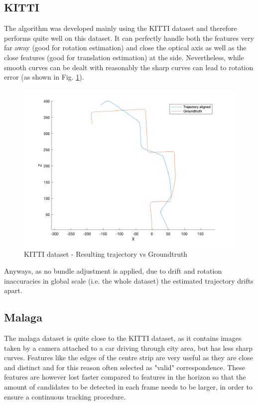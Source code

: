 \documentclass[letterpaper, 12 pt]{article}
\begin{document}
\begin{multicols*}{2}
\subsection{KITTI}
The algorithm was developed mainly using the KITTI dataset and therefore performs quite well on this dataset. It can perfectly handle both the features very far away (good for rotation estimation) and close the optical axis as well as the close features (good for translation estimation) at the side. Nevertheless, while smooth curves can be dealt with reasonably the sharp curves can lead to rotation error (as shown in Fig. \ref{fig:results_kitti}). 

\begin{figure}[H]
\begin{center}
\includegraphics[width=\linewidth]{kitti.png}
\end{center}
\caption{KITTI dataset - Resulting trajectory vs Groundtruth}
\label{fig:results_kitti}
\end{figure}

Anyways, as no bundle adjustment is applied, due to drift and rotation inaccuracies in global scale (i.e. the whole dataset) the estimated trajectory drifts apart. 

\subsection{Malaga}
The malaga dataset is quite close to the KITTI dataset, as it contains images taken by a camera attached to a car driving through city area, but has less sharp curves. Features like the edges of the centre strip are very useful as they are close and distinct and for this reason often selected as "valid" correspondence. These features are however lost faster compared to features in the horizon so that the amount of candidates to be detected in each frame needs to be larger, in order to ensure a continuous tracking procedure. 


\end{multicols*}
\end{document}
